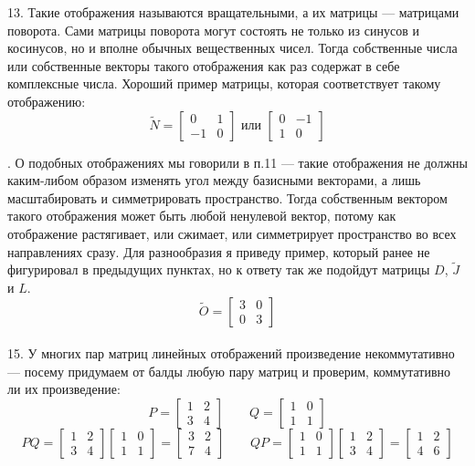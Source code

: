 \documentclass[a3paper,14pt]{extarticle}
\begin{document}
13. Такие отображения называются вращательными, а их матрицы --- матрицами поворота. Сами матрицы поворота могут состоять не только из синусов и косинусов, но и вполне обычных вещественных чисел. Тогда собственные числа или собственные векторы такого отображения как раз содержат в себе комплексные числа. Хороший пример матрицы, которая соответствует такому отображению:
$$\tilde{N} = \begin{bmatrix}
    0 & 1 \\ -1 & 0
\end{bmatrix} \text{ или } \begin{bmatrix}
    0 & -1 \\ 1 & 0
\end{bmatrix}$$ \pagebreak

. О подобных отображениях мы говорили в п.11 --- такие отображения не должны каким-либом образом изменять угол между базисными векторами, а лишь масштабировать и симметрировать пространство. Тогда собственным вектором такого отображения может быть любой ненулевой вектор, потому как отображение растягивает, или сжимает, или симметрирует пространство во всех направлениях сразу. Для разнообразия я приведу пример, который ранее не фигурировал в предыдущих пунктах, но к ответу так же подойдут матрицы $D$, $\tilde{J}$ и $L$.
$$\tilde{O} = \begin{bmatrix}
    3 & 0 \\ 0 & 3
\end{bmatrix}$$\,\\[0.5em]
15. У многих пар матриц линейных отображений произведение некоммутативно --- посему придумаем от балды любую пару матриц и проверим, коммутативно ли их произведение:
$$P = \begin{bmatrix}
    1 & 2 \\ 3 & 4
\end{bmatrix}\qquad Q = \begin{bmatrix}
    1 & 0 \\ 1 & 1
\end{bmatrix}$$
$$PQ = \begin{bmatrix}
    1 & 2 \\ 3 & 4
\end{bmatrix}\begin{bmatrix}
    1 & 0 \\ 1 & 1
\end{bmatrix} = \begin{bmatrix}
    3 & 2 \\ 7 & 4
\end{bmatrix}\qquad QP = \begin{bmatrix}
    1 & 0 \\ 1 & 1
\end{bmatrix}\begin{bmatrix}
    1 & 2 \\ 3 & 4
\end{bmatrix} = \begin{bmatrix}
    1 & 2 \\ 4 & 6 
\end{bmatrix}$$
\end{document}
